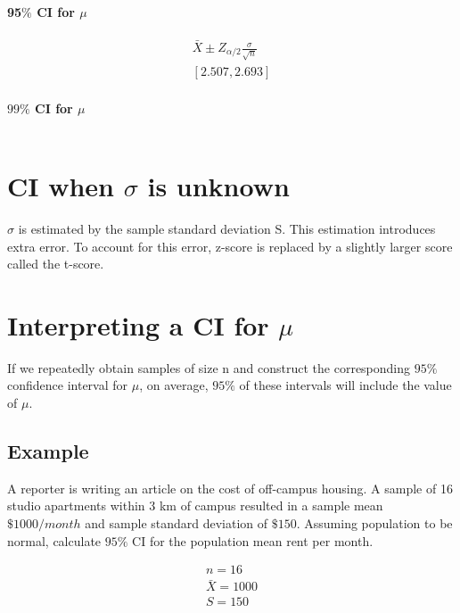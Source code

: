 \documentclass{article}
\begin{document}
    \paragraph*{95$\%$ CI for $\mu$}
        \begin{align*}
            \bar{X} \pm Z_{\alpha/2} \frac{\sigma}{\sqrt{n}}\\
            [2.507, 2.693]
        \end{align*}

    \paragraph*{$99\%$ CI for $\mu$}
        \begin{equation*}
             [2.471, 2.729]
        \end{equation*}

    \section*{CI when $\sigma$ is unknown}
        $\sigma$ is estimated by the sample standard deviation S.
        This estimation introduces extra error. To account for this error,
        z-score is replaced by a slightly larger score called the t-score.

    \section*{Interpreting a CI for $\mu$}
    If we repeatedly obtain samples of size n and construct the corresponding $95\%$ 
    confidence interval for $\mu$, on average, $95\%$ of these intervals will include the value of $\mu$.

    \subsection*{Example}
    A reporter is writing an article on the cost of 
    off-campus housing. A sample of 16 studio apartments within 3 km of campus 
    resulted in a sample mean $\$1000/month$ and sample standard deviation of $\$150$.
    Assuming population to be normal, calculate $95\%$ CI for the population mean rent per month.

    \begin{align*}
        n = 16\\
        \bar{X} = 1000\\
        S = 150
    \end{align*}
\end{document}
